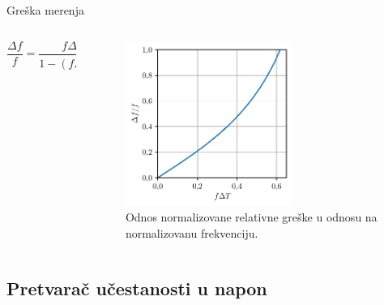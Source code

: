 \documentclass[aspectratio=169,xcolor=dvipsnames]{beamer}
\begin{document}


\begin{frame}{Greška merenja}
	\begin{columns}[c]
    \begin{column}{.4\textwidth}
    \centering
    		$$\frac{\Delta f}{f} = \frac{f \Delta t}{1 - (f \Delta f)^2}$$      
    \end{column}
    \begin{column}{.6\textwidth}
    \begin{figure}
        \centering
        \includegraphics[width=0.65\textwidth]{fig/fGreska.pdf}
        \caption{Odnos normalizovane relativne greške u odnosu na normalizovanu frekvenciju.}
    \end{figure}
    \end{column}
\end{columns}
\end{frame}


\subsection{Pretvarač učestanosti u napon}
\end{document}
